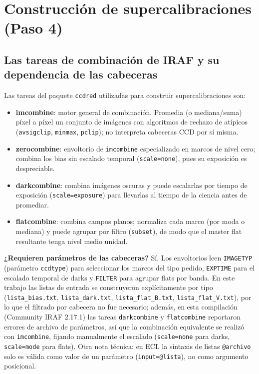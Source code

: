 \documentclass[10pt,a4paper]{article}
\begin{document}
\section{Construcción de supercalibraciones (Paso 4)}

\subsection{Las tareas de combinación de IRAF y su dependencia de las cabeceras}

Las tareas del paquete \texttt{ccdred} utilizadas para construir supercalibraciones son:

\begin{itemize}
\item \textbf{imcombine}: motor general de combinación. Promedia (o mediana/suma) píxel a píxel un conjunto de imágenes con algoritmos de rechazo de atípicos (\texttt{avsigclip}, \texttt{minmax}, \texttt{pclip}); no interpreta cabeceras CCD por sí misma.
\item \textbf{zerocombine}: envoltorio de \texttt{imcombine} especializado en marcos de nivel cero; combina los bias sin escalado temporal (\texttt{scale=none}), pues su exposición es despreciable.
\item \textbf{darkcombine}: combina imágenes oscuras y puede escalarlas por tiempo de exposición (\texttt{scale=exposure}) para llevarlas al tiempo de la ciencia antes de promediar.
\item \textbf{flatcombine}: combina campos planos; normaliza cada marco (por moda o mediana) y puede agrupar por filtro (\texttt{subset}), de modo que el master flat resultante tenga nivel medio unidad.
\end{itemize}

\noindent\textbf{¿Requieren parámetros de las cabeceras?} Sí. Los envoltorios
leen \texttt{IMAGETYP} (parámetro \texttt{ccdtype}) para seleccionar los marcos
del tipo pedido, \texttt{EXPTIME} para el escalado temporal de darks y
\texttt{FILTER} para agrupar flats por banda. En este trabajo las listas de
entrada se construyeron explícitamente por tipo
(\texttt{lista\_bias.txt}, \texttt{lista\_dark.txt},
\texttt{lista\_flat\_B.txt}, \texttt{lista\_flat\_V.txt}), por lo que el
filtrado por cabecera no fue necesario; además, en esta compilación
(Community IRAF 2.17.1) las tareas \texttt{darkcombine} y \texttt{flatcombine}
reportaron errores de archivo de parámetros, así que la combinación
equivalente se realizó con \texttt{imcombine}, fijando manualmente el escalado
(\texttt{scale=none} para darks, \texttt{scale=mode} para flats). Otra nota
técnica: en ECL la sintaxis de listas \texttt{@archivo} solo es válida como
valor de un parámetro (\texttt{input=@lista}), no como argumento posicional.
\end{document}

